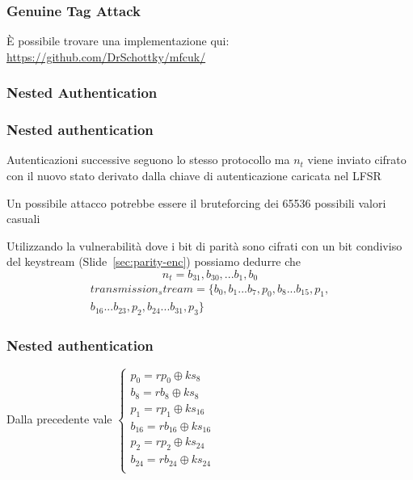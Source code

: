 \begin{frame}
    \frametitle{Genuine Tag Attack}
    È possibile trovare una implementazione qui: \href{https://github.com/DrSchottky/mfcuk/blob/master/src/mfcuk.c\#L623}{https://github.com/DrSchottky/mfcuk/}
\end{frame}

\subsubsection{Nested Authentication}
\begin{frame}
    \frametitle{Nested authentication}\label{sec:nested-auth}
    Autenticazioni successive seguono lo stesso protocollo ma $n_t$ viene inviato cifrato con il nuovo stato derivato dalla chiave di autenticazione
    caricata nel LFSR\pause

    Un possibile attacco potrebbe essere il bruteforcing dei 65536 possibili valori casuali\pause

    Utilizzando la vulnerabilità dove i bit di parità sono cifrati con un bit condiviso del keystream (Slide~\ref{sec:parity-enc}) possiamo dedurre che
    \[n_t = {b_{31},b_{30}, ... b_1, b_0}\]
    \begin{multline*}
        transmission_stream = \{b_0, b_1 ... b_7, p_0, b_8 ... b_{15}, p_1, \\ b_{16} ... b_{23}, p_2, b_{24} ... b_{31}, p_3\}
    \end{multline*}

\end{frame}

\begin{frame}
    \frametitle{Nested authentication}
    Dalla precedente vale
    \begin{math}
        \begin{cases}
            p_0 = rp_0 \oplus ks_8\\
            b_8 = rb_8 \oplus ks_8\\
            p_1 = rp_1 \oplus ks_{16}\\
            b_{16} = rb_{16} \oplus ks_{16}\\
            p_2 = rp_2 \oplus ks_{24}\\
            b_{24} = rb_{24} \oplus ks_{24}\\
        \end{cases}
    \end{math}
\end{frame}

